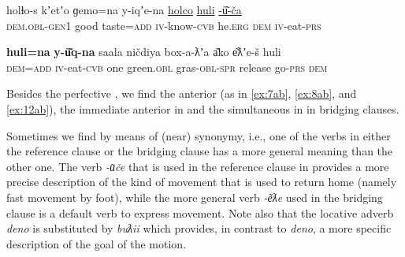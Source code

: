 \documentclass[output=paper]{LSP/langsci}
\begin{document}
\begin{exe}
	\ex	\label{ex:13ab} 
	\begin{xlist}
		\ex	\label{ex:13a}
		\gll	holɬo-s     		kʼetʼo 	ɡemo=na   	y-iqʼe-na  			\underline{holco}  	\underline{huli}   \underline{-ü͂-ča}\\
			\textsc{dem.obl-gen1} 	good     taste=\textsc{add}  	\textsc{iv}-know-\textsc{cvb} 	he.\textsc{erg}	\textsc{dem} 	\textsc{iv}-eat-\textsc{prs}\\
		\glt	{}

		\ex	\label{ex:13b}
		\gll			\textbf{huli=na}   	\textbf{y-ü͂q-na}  	saala 	ničdiya 		box-a-ƛʼa 		a͂ko e͂ƛʼe-š 	huli \\
			\textsc{dem=add}  	\textsc{iv}-eat-\textsc{cvb} 	one   	green.\textsc{obl} 	gras-\textsc{obl-spr} 	release go-\textsc{prs} 	\textsc{dem}  \\
		\glt	{}
	\end{xlist}
\end{exe}

Besides the perfective , we find the anterior  (as in \ref{ex:7ab}, \ref{ex:8ab}, and \ref{ex:12ab}), the immediate anterior  in  and the simultaneous  in  in bridging clauses. 

Sometimes we find  by means of (near) synonymy, i.e., one of the verbs in either the reference clause or the bridging clause has a more general meaning than the other one. The verb \textit{-u͂če}  that is used in the reference clause in  provides a more precise description  of the kind of movement that is used to return home (namely fast movement by foot), while the more general verb  \textit{-e͂ƛe}  used in the bridging clause is a default verb to express movement. Note also that the locative adverb \textit{deno}  is substituted by \textit{buƛii}  which provides, in contrast to \textit{deno}, a more specific description of the goal of the motion. 
\end{document}
